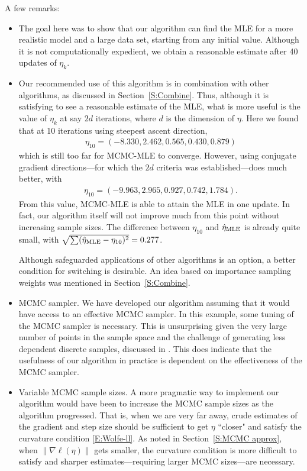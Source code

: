 A few remarks:
\begin{itemize}
\item The goal here was to show that our algorithm can find the MLE for a more realistic model and a large data set, starting from any initial value.
Although it is not computationally expedient, 
we obtain a reasonable estimate after 40 updates of $\eta_k$.  

\item Our recommended use of this algorithm is in combination with other algorithms,
as discussed in Section~\ref{S:Combine}.  Thus, although it is satisfying to see a reasonable estimate of the MLE, what is more useful is the value of $\eta_k$ 
at say $2d$ iterations, where $d$ is the dimension of $\eta$.  
Here we found that at 10 iterations using steepest ascent direction,
\begin{align*}
	\eta_{10} =( -8.330,  2.462,  0.565,  0.430,  0.879) 
\end{align*}
which is still too far for MCMC-MLE to converge.
However, using conjugate gradient directions---for which the $2d$ criteria was
established---does much better, with
\begin{align*}
	\eta_{10} =( -9.963,  2.965,  0.927,  0.742,  1.784).
\end{align*}
From this value, MCMC-MLE is able to attain the MLE in one update.  In fact,
our algorithm itself will not improve much from this point without increasing sample
sizes.  The difference between $\eta_{10}$ and $\hat{\eta}_{\textrm{MLE}}$ is already quite small,
 with $\sqrt{ \sum( \hat{\eta}_{\textrm{MLE}} - \eta_{10})^2} = 0.277$.

Although safeguarded applications of other algorithms is an option, a better condition
for switching is desirable.  An idea based on importance sampling weights was mentioned
in Section~\ref{S:Combine}.

\item MCMC sampler.  We have developed our algorithm assuming that it would have access
to an effective MCMC sampler.  In this example, some tuning of the MCMC
sampler is necessary.  
This is unsurprising given the very large number of points in the sample space 
and the challenge of generating less dependent discrete samples, discussed 
in \citep{ergm,Morris:2008}.
This does indicate that the usefulness of our algorithm in practice is dependent on the 
effectiveness of the MCMC sampler.

\item Variable MCMC sample sizes.  A more pragmatic way to implement our 
algorithm would have
been to increase the MCMC sample sizes as the algorithm progressed.  That is, when
we are very far away, crude estimates of the gradient and step size should be sufficient
to get $\eta$ ``closer" and satisfy the curvature condition \eqref{E:Wolfe-ll}.
As noted in Section~\ref{S:MCMC approx}, when $\lVert \nabla \ell(\eta) \rVert$ gets
smaller, the curvature condition is more difficult to satisfy and sharper estimates---requiring larger MCMC sizes---are necessary.
\end{itemize}

